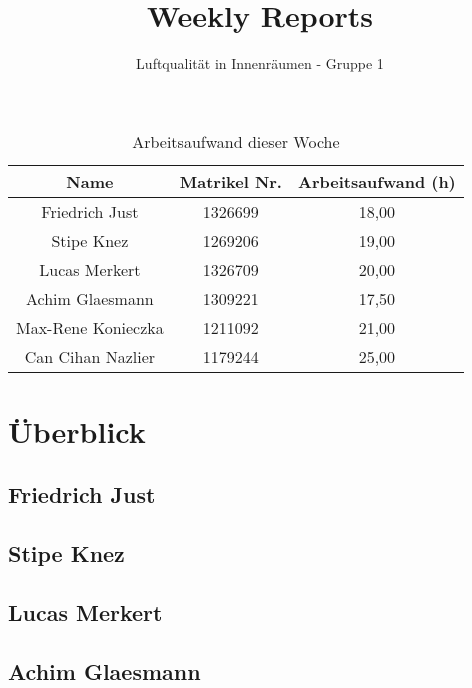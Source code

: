 \documentclass[]{article}
\title{Weekly Reports}
\author{Luftqualität in Innenräumen - Gruppe 1}
\begin{document}
\maketitle

\begin{table}[h!]
	\centering
	\begin{tabular}{|c|c|c|}
		\hline
		{\textbf{Name}}				&		{\textbf{Matrikel Nr.}} & {\textbf{Arbeitsaufwand (h)}} \\
		\hline
		Friedrich Just				&		1326699 				&		18,00\\
		\hline
		Stipe Knez					&		1269206 				&	19,00	\\
		\hline
		Lucas Merkert				&		1326709					&	20,00	\\
		\hline
		Achim Glaesmann				&		1309221					&	17,50	\\
		\hline
		Max-Rene Konieczka			&		1211092					&	21,00	\\
		\hline
		Can Cihan Nazlier			&		1179244					&	25,00	\\
		\hline
	\end{tabular}
	\caption{Arbeitsaufwand dieser Woche}
	\label{tab:worakload}
\end{table}



\section{Überblick}


\subsection{Friedrich Just}







\subsection{Stipe Knez}

\subsection{Lucas Merkert}



\subsection{Achim Glaesmann}
\end{document}
